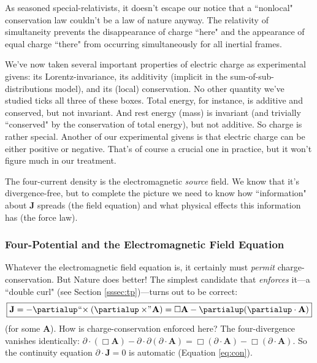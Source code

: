 \documentclass[12pt]{article}
\renewcommand{\vv}[1]{\mathbf{#1}}
\begin{document}
As seasoned special-relativists, it doesn't escape our notice that a ``nonlocal" conservation law couldn't be a law of nature anyway. The relativity of simultaneity prevents the disappearance of charge ``here" and the appearance of equal charge ``there" from occurring simultaneously for all inertial frames.

We've now taken several important properties of electric charge as experimental givens: its Lorentz-invariance, its additivity (implicit in the sum-of-sub-distributions model), and its (local) conservation. No other quantity we've studied ticks all three of these boxes. Total energy, for instance, is additive and conserved, but not invariant. And rest energy (mass) is invariant (and trivially ``conserved" by the conservation of total energy), but not additive. So charge is rather special. Another of our experimental givens is that electric charge can be either positive or negative. That's of course a crucial one in practice, but it won't figure much in our treatment.

The four-current density is the electromagnetic \emph{source} field. We know that it's divergence-free, but to complete the picture we need to know how ``information" about $\vv J$ spreads (the field equation) and what physical effects this information has (the force law).


\subsubsection{Four-Potential and the Electromagnetic Field Equation}\label{sssec:fp}

Whatever the electromagnetic field equation is, it certainly must \emph{permit} charge-conservation. But Nature does better! The simplest candidate that \emph{enforces} it---a ``double curl" (see Section \ref{sssec:tp})---turns out to be correct:
\begin{equation}\label{eq:gfp}
\boxed{
\vv J = - \partialup \mkern1mu `` \mkern-4mu \times ( \partialup \times \mkern-4mu " \mkern1mu \vv A) = \Box \vv A - \partialup ( \partialup \cdot \vv A)
}
\end{equation}
(for some $\vv A$). How is charge-conservation enforced here? The four-divergence vanishes identically: ${\partialup \cdot (\Box \vv A) - \partialup \cdot \partialup (\partialup \cdot \vv A) = \Box (\partialup \cdot \vv A) - \Box (\partialup \cdot \vv A)}$. So the continuity equation $\partialup \cdot \vv J = 0$ is automatic (Equation \ref{eq:con}).
\end{document}
